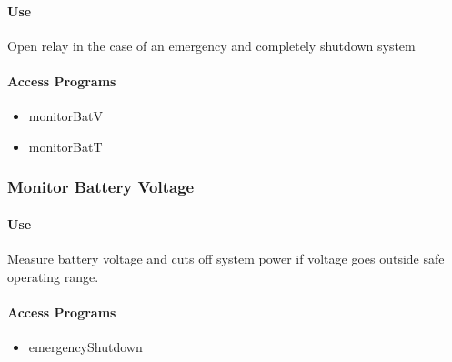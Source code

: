 \documentclass[10pt,letterpaper]{article}
\begin{document}
\paragraph{Use}
Open relay in the case of an emergency and completely shutdown system

\paragraph{Access Programs}
\begin{itemize}
\item monitorBatV
\item monitorBatT
\end{itemize}
\begin{table}[H]
  \caption{emergencyShutdown}
\end{table}

\subsubsection{Monitor Battery Voltage}
\paragraph{Use}
Measure battery voltage and cuts off system power if voltage goes outside safe operating range.
\paragraph{Access Programs}
\begin{itemize}
\item emergencyShutdown
\end{itemize}
\begin{table}[H]
  \caption{monitorBatV}
\end{table}
\end{document}

